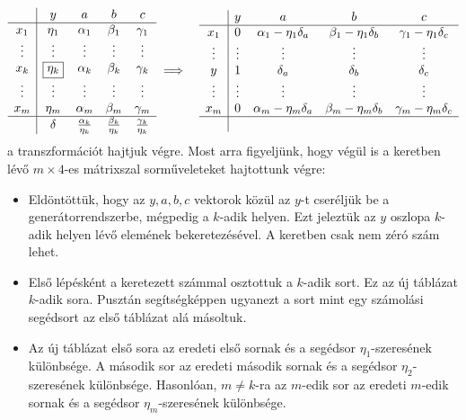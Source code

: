 \documentclass[9pt, a4paper, showtrims]{memoir}
\theoremstyle{plain}
\theoremstyle{remark}
\theoremstyle{definition}
\begin{document}
\begin{eqnarray*}
    \begin{array}{c|cccc}
        &y      &a        &b         &c\\
        \hline
        x_1         &\eta_1  &\alpha_1 &\beta_1 &\gamma_1 \\
        \vdots      &\vdots &\vdots    &\vdots  &\vdots\\
        x_k         &\boxed{\eta_k}  &\alpha_k&\beta_k&\gamma_k   \\
        \vdots      &\vdots &\vdots    &\vdots&\vdots\\
        x_m         &\eta_m  &\alpha_m   &\beta_m&\gamma_m\\
        \hline
        &\delta &\frac{\alpha_k}{\eta_k}&\frac{\beta_k}{\eta_k}&\frac{\gamma_k}{\eta_k}\\
    \end{array}
    &\implies&
    \begin{array}{c|cccc}
        &y      &a         &b        &c\\
        \hline
        x_1         &0  &\alpha_1-\eta_1\delta_a   &\beta_1-\eta_1\delta_b&\gamma_1-\eta_1\delta_c\\
        \vdots      &\vdots &\vdots&\vdots&\vdots    \\
        y           &1  &\delta_a&\delta_b&\delta_c  \\
        \vdots      &\vdots &\vdots &\vdots &\vdots    \\
        x_m         &0  &\alpha_m-\eta_m\delta_a&\beta_m-\eta_m\delta_b&\gamma_m-\eta_m\delta_c   \\
        \hline
        &&
    \end{array}
\end{eqnarray*}
a transzformációt hajtjuk végre.
Most arra figyeljünk, 
hogy végül is a keretben lévő $m\times 4$-es mátrixszal sorműveleteket hajtottunk végre:
\begin{itemize}
    \item 
        Eldöntöttük, hogy az $y,a,b,c$ vektorok közül az $y$-t cseréljük be a generátorrendszerbe,
        mégpedig a $k$-adik helyen. 
        Ezt jeleztük az $y$ oszlopa $k$-adik helyen lévő elemének bekeretezésével. 
        A keretben csak nem zéró szám lehet.
    \item 
        Első lépésként a keretezett számmal osztottuk a $k$-adik sort. Ez az új táblázat $k$-adik sora.
        Pusztán segítségképpen ugyanezt a sort mint egy számolási segédsort az első táblázat alá másoltuk.
    \item 
        Az új táblázat első sora az eredeti első sornak és a segédsor $\eta_1$-szeresének különbsége.
        A második sor az eredeti második sornak és a segédsor $\eta_2$-szeresének különbsége.
        Hasonlóan, $m\neq k$-ra az $m$-edik sor az eredeti $m$-edik sornak és a segédsor $\eta_m$-szeresének különbsége.
\end{itemize}
\end{document}
